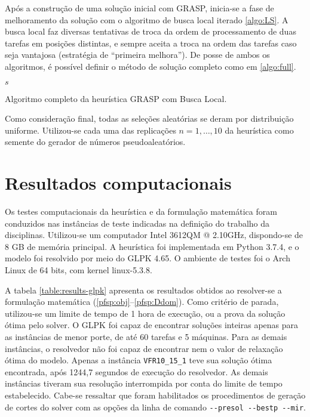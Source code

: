 \documentclass[12pt]{article}
\begin{document}
Após a construção de uma solução inicial com GRASP, inicia-se a fase de
melhoramento da solução com o algoritmo de busca local iterado \ref{algo:LS}.
A busca local faz diversas tentativas de troca da ordem de processamento de
duas tarefas em posições distintas, e sempre aceita a troca na ordem das
tarefas caso seja vantajosa (estratégia de ``primeira melhora''). De posse de
ambos os algoritmos, é possível definir o método de solução completo como em
\ref{algo:full}.

\begin{algorithm}[H]
   \footnotesize
   \Return $s$
   \caption{Algoritmo completo da heurística GRASP com Busca Local.}
   \label{algo:full}
\end{algorithm}

Como consideração final, todas as seleções aleatórias se deram
por distribuição uniforme. Utilizou-se cada uma das replicações 
$n=1, \dots, 10$ da heurística como semente do gerador de números
pseudoaleatórios.

\section{Resultados computacionais}

Os testes computacionais da heurística e da formulação matemática foram
conduzidos nas instâncias de teste indicadas na definição do trabalho da
disciplinas. Utilizou-se um computador Intel 3612QM @ 2.10GHz, dispondo-se de
8 GB de memória principal. A heurística foi implementada em Python 
3.7.4, e o modelo foi resolvido por meio do GLPK 4.65. O ambiente de testes foi
o Arch Linux de 64 bits, com kernel linux-5.3.8.

A tabela \ref{table:results-glpk} apresenta os resultados obtidos ao
resolver-se a formulação matemática (\ref{pfsp:obj}--\ref{pfsp:Ddom}). Como
critério de parada, utilizou-se um limite de tempo de 1 hora de execução, ou
a prova da solução ótima pelo solver. O GLPK foi capaz de encontrar
soluções inteiras apenas para as instâncias de menor porte, de até 60 tarefas e
5 máquinas. Para as demais instâncias, o resolvedor não foi capaz de encontrar
nem o valor de relaxação ótima do modelo. Apenas a instância
\texttt{VFR10\_15\_1} teve sua solução ótima encontrada, após 1244,7 segundos de
execução do resolvedor. As demais instâncias tiveram sua resolução interrompida
por conta do limite de tempo estabelecido. Cabe-se ressaltar que foram
habilitados os procedimentos de geração de cortes do solver com as opções da
linha de comando \texttt{-{}-presol -{}-bestp -{}-mir}.
\end{document}
